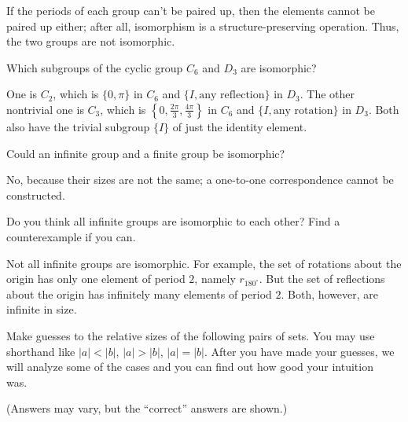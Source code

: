 \documentclass[../key.tex]{subfiles}
\begin{document}
\noindent If the periods of each group can't be paired up, then the elements cannot be paired up either; after all, isomorphism is a structure-preserving operation. Thus, the two groups are not isomorphic.

\begin{inner_problem}
\item Which subgroups of the cyclic group $C_6$ and $D_3$ are isomorphic?
\end{inner_problem}

\noindent One is $C_2$, which is $\{0,\pi\}$ in $C_6$ and $\{I,\text{any reflection}\}$ in $D_3$. The other nontrivial one is $C_3$, which is $\left\{0,\frac{2\pi}{3},\frac{4\pi}{3}\right\}$ in $C_6$ and $\{I,\text{any rotation}\}$ in $D_3$. Both also have the trivial subgroup $\{I\}$ of just the identity element.

\begin{outer_problem}
\item Could an infinite group and a finite group be isomorphic?
\end{outer_problem}

\noindent No, because their sizes are not the same; a one-to-one correspondence cannot be constructed.

\begin{outer_problem}
\item Do you think all infinite groups are isomorphic to each other? Find a counterexample if you can.
\end{outer_problem}

\noindent Not all infinite groups are isomorphic. For example, the set of rotations about the origin has only one element of period $2$, namely $r_{180^\circ}$. But the set of reflections about the origin has infinitely many elements of period $2$. Both, however, are infinite in size.

\begin{outer_problem}
\item Make guesses to the relative sizes of the following pairs of sets. You may use shorthand like $|a| < |b|$, $|a| > |b|$, $|a| = |b|$. After you have made your guesses, we will analyze some of the cases and you can find out how good your intuition was.~\label{prob:infinity_guesses}
\end{outer_problem}

\noindent (Answers may vary, but the ``correct'' answers are shown.)
\end{document}
